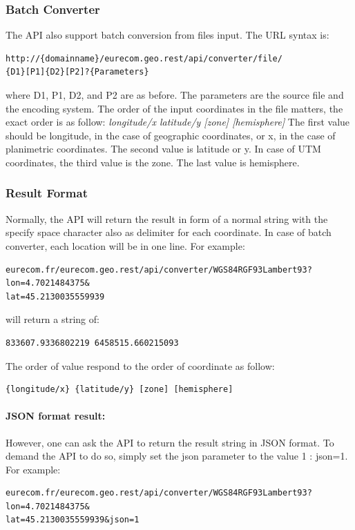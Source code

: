 \subsubsection{Batch Converter}
The API also support batch conversion from files input. The URL syntax is:
\begin{verbatim}
http://{domainname}/eurecom.geo.rest/api/converter/file/
{D1}[P1]{D2}[P2]?{Parameters}
\end{verbatim}

where D1, P1, D2, and P2 are as before. The parameters are the source file and the encoding system. 
The order of the input coordinates in the file matters, the exact order is as follow:
\textit{{longitude/x} {latitude/y} [zone] [hemisphere]}
The first value should be longitude, in the case of geographic coordinates, or x, in the case of planimetric coordinates. The second value is latitude or y. In case of UTM coordinates, the third value is the zone. The last value is hemisphere. 

\subsubsection{Result Format}
Normally, the API will return the result in form of a normal string with the specify space character also as delimiter for each coordinate. In case of batch converter, each location will be in one line. For example:
\begin{verbatim}
eurecom.fr/eurecom.geo.rest/api/converter/WGS84RGF93Lambert93?lon=4.7021484375&
lat=45.2130035559939
\end{verbatim}

will return a string of:
\begin{verbatim}
833607.9336802219 6458515.660215093
\end{verbatim}

The order of value respond to the order of coordinate as follow:
\begin{verbatim}
{longitude/x} {latitude/y} [zone] [hemisphere]
\end{verbatim}

\paragraph{JSON format result:}
However, one can ask the API to return the result string in JSON format. To demand the API to do so, simply set the json parameter to the value 1 : json=1. For example:
\begin{verbatim}
eurecom.fr/eurecom.geo.rest/api/converter/WGS84RGF93Lambert93?lon=4.7021484375&
lat=45.2130035559939&json=1
\end{verbatim}

